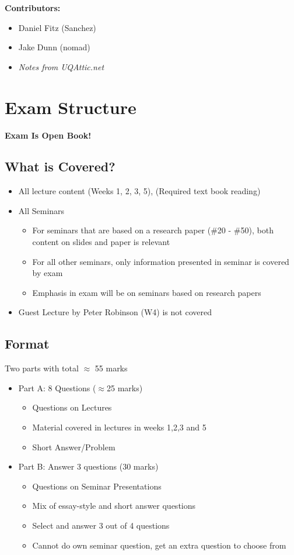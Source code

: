 \documentclass[12pt, a4paper]{article}
\begin{document}
	\tableofcontents
	\vspace{2em}
	\textbf{Contributors:}
	\begin{itemize}
		\item Daniel Fitz (Sanchez)
		\item Jake Dunn (nomad)
		\item \textit{Notes from UQAttic.net}
	\end{itemize}
	\newpage


\section{Exam Structure}
\textbf{Exam Is Open Book!}
\subsection{What is Covered?}
\begin{itemize}
	\item All lecture content (Weeks 1, 2, 3, 5), (Required text book reading)
	\item All Seminars
	\begin{itemize}
		\item For seminars that are based on a research paper (\#20 - \#50), both content on slides and paper is relevant
		\item For all other seminars, only information presented in seminar is covered by exam
		\item Emphasis in exam will be on seminars based on research papers
	\end{itemize}
	\item Guest Lecture by Peter Robinson (W4) is not covered
\end{itemize}
\subsection{Format}
Two parts with total $\approx$ 55 marks
\begin{itemize}
	\item Part A: 8 Questions ($\approx$25 marks)
	\begin{itemize}
		\item Questions on Lectures
		\item Material covered in lectures in weeks 1,2,3 and 5
		\item Short Answer/Problem
	\end{itemize}
	\item Part B: Answer 3 questions (30 marks)
	\begin{itemize}
		\item Questions on Seminar Presentations
		\item Mix of essay-style and short answer questions
		\item Select and answer 3 out of 4 questions
		\item Cannot do own seminar question, get an extra question to choose from
	\end{itemize}
\end{itemize}
\end{document}
